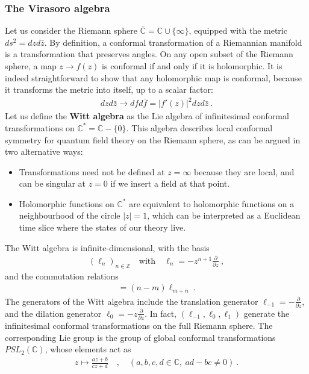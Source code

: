 \documentclass[12pt, a4paper]{article}
\theoremstyle{break}
\begin{document}
\subsubsection{The Virasoro algebra}

Let us consider the Riemann sphere $\overline{\mathbb{C}}=\mathbb{C}\cup \{\infty\}$, equipped with the metric $ds^2 = dzd\bar z$. By definition, a conformal transformation of a Riemannian manifold is a transformation that preserves angles. On any open subset of the Riemann sphere, a map $z\to f(z)$ is conformal if and only if it is holomorphic. It is indeed straightforward to show that any holomorphic map is conformal,
because it transforms the metric into itself, up to a scalar factor: 
\begin{align}
 dzd\bar z\to dfd\bar f = |f'(z)|^2 dzd\bar z\ .
\end{align}
Let us define the \textbf{Witt algebra} as the Lie algebra of infinitesimal conformal transformations on $\mathbb{C}^*= \mathbb{C}-\{0\}$. This algebra describes local conformal symmetry for quantum field theory on the Riemann sphere, as can be argued in two alternative ways:
\begin{itemize}
 \item Transformations need not be defined at $z=\infty$ because they are local, and can be singular at $z=0$ if we insert a field at that point.
 \item Holomorphic functions on $\mathbb{C}^*$ are equivalent to holomorphic functions on a neighbourhood of the circle $|z|=1$, which can be interpreted as a Euclidean time slice where the states of our theory live. 
\end{itemize}
The Witt algebra is infinite-dimensional, with the basis 
\begin{align}
 \left(\ell_n\right)_{n\in\mathbb{Z}}  \quad \text{with} \quad \ell_n = -z^{n+1}\frac{\partial}{\partial z}\ , 
\end{align}
and the commutation relations 
\begin{align}
 [\ell_n,\ell_m] = (n-m)\ell_{m+n}\ .
\end{align}
The generators of the Witt algebra include the translation generator $\ell_{-1} = -\frac{\partial}{\partial z}$, and the dilation generator $\ell_0 = -z\frac{\partial}{\partial z}$. In fact, $(\ell_{-1},\ell_0,\ell_1)$ generate the infinitesimal conformal transformations on the full Riemann sphere.
The corresponding Lie group is the group of global conformal transformations $PSL_2(\mathbb{C})$, whose elements act as 
\begin{align}
 z \mapsto \frac{az+b}{cz+d}\quad , \quad (a,b,c,d\in \mathbb{C},\ ad-bc\neq 0)\ .
\end{align}
\end{document}
